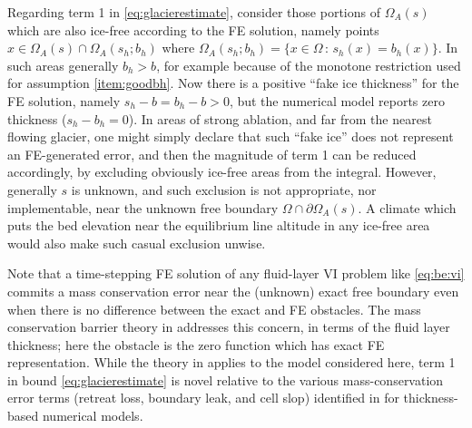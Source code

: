 \documentclass[hidelinks,onefignum,onetabnum,final]{siamart220329}  %
\begin{document}
Regarding term 1 in \eqref{eq:glacierestimate}, consider those portions of $\Omega_A(s)$ which are also ice-free according to the FE solution, namely points $x \in \Omega_A(s) \cap \Omega_A(s_h;b_h)$ where $\Omega_A(s_h;b_h) = \{x\in\Omega\,:\,s_h(x)=b_h(x)\}$.  In such areas generally $b_h > b$, for example because of the monotone restriction used for assumption \ref{item:goodbh}.  Now there is a positive ``fake ice thickness'' for the FE solution, namely $s_h - b=b_h-b>0$, but the numerical model reports zero thickness ($s_h-b_h=0$).  In areas of strong ablation, and far from the nearest flowing glacier, one might simply declare that such ``fake ice'' does not represent an FE-generated error, and then the magnitude of term 1 can be reduced accordingly, by excluding obviously ice-free areas from the integral.  However, generally $s$ is unknown, and such exclusion is not appropriate, nor implementable, near the unknown free boundary $\Omega \cap \partial \Omega_A(s)$.  A climate which puts the bed elevation near the equilibrium line altitude \cite{GreveBlatter2009} in any ice-free area would also make such casual exclusion unwise.

Note that a time-stepping FE solution of any fluid-layer VI problem like \eqref{eq:be:vi} commits a mass conservation error near the (unknown) exact free boundary even when there is no difference between the exact and FE obstacles.  The mass conservation barrier theory in \cite{Bueler2021conservation} addresses this concern, in terms of the fluid layer thickness; here the obstacle is the zero function which has exact FE representation.  While the theory in \cite{Bueler2021conservation} applies to the model considered here, term 1 in bound \eqref{eq:glacierestimate} is novel relative to the various mass-conservation error terms (retreat loss, boundary leak, and cell slop) identified in \cite{Bueler2021conservation} for thickness-based numerical models.
\end{document}
